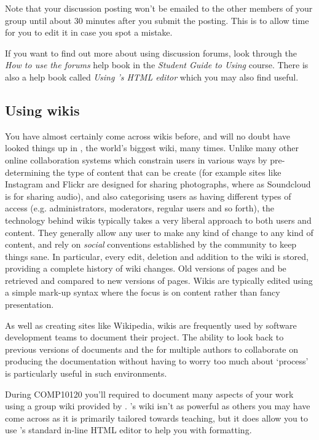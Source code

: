 Note that your discussion posting won't be emailed to the other members of your group until about 30 minutes after you submit the posting. This is to allow time for you to edit it in case you spot a mistake.

If you want to find out more about using discussion forums, look through the \emph{How to use the forums}  help book in the \emph{Student Guide to Using \Moodle} course. There is also a help book called \emph{Using \moodle's HTML editor} which you may also find useful.

\subsection{Using wikis}
\label{sec:using-wikis}


You have almost certainly come across wikis before, and will no doubt have looked things up in , the world's biggest wiki, many times. Unlike many other online collaboration systems which constrain users in various ways by pre-determining the type of content that can be create (for example sites like Instagram and Flickr are designed for sharing photographs, where as Soundcloud is for sharing audio), and also categorising users as having different types of access (e.g. administrators, moderators, regular users and so forth), the technology behind wikis typically takes a very liberal approach to both users and content. They generally allow any user to make any kind of change to any kind of content, and rely on \textit{social} conventions established by the community to keep things sane. In particular, every edit, deletion and addition to the wiki is stored, providing a complete history of wiki changes. Old versions of pages and be retrieved and compared to new versions of pages. Wikis are typically edited using a simple mark-up syntax where the focus is on content rather than fancy presentation.


As well as creating sites like Wikipedia, wikis are frequently used by software development teams to document their project. The ability to look back to previous versions of documents and the for multiple authors to collaborate on producing the documentation without having to worry too much about `process' is particularly useful in such environments.

During COMP10120 you'll required to document many aspects of your work using a group wiki provided by \Moodle. \Moodle's wiki isn't as powerful as others you may have come across as it is primarily tailored towards teaching, but it does allow you to use \Moodle's standard in-line HTML editor to help you with formatting.

